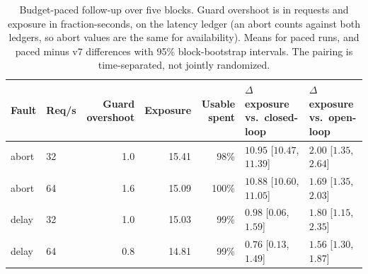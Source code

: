 \begin{table}[width=\textwidth,cols=7,pos=t]
\caption{Budget-paced follow-up over five blocks. Guard overshoot is in requests and exposure in fraction-seconds, on the latency ledger (an abort counts against both ledgers, so abort values are the same for availability). Means for paced runs, and paced minus v7 differences with 95\% block-bootstrap intervals. The pairing is time-separated, not jointly randomized.}\label{tbl:followup}
\footnotesize
\begin{tabular*}{\tblwidth}{@{\extracolsep{\fill}}llrrrll@{}}
\toprule
Fault & Req/s & Guard overshoot & Exposure & Usable spent & $\Delta$ exposure vs.\ closed-loop & $\Delta$ exposure vs.\ open-loop \\
\midrule
abort & 32 & 1.0 & 15.41 & 98\% & $10.95$ [$10.47$, $11.39$] & $2.00$ [$1.35$, $2.64$] \\
abort & 64 & 1.6 & 15.09 & 100\% & $10.88$ [$10.60$, $11.05$] & $1.69$ [$1.35$, $2.03$] \\
delay & 32 & 1.0 & 15.03 & 99\% & $0.98$ [$0.06$, $1.59$] & $1.80$ [$1.15$, $2.35$] \\
delay & 64 & 0.8 & 14.81 & 99\% & $0.76$ [$0.13$, $1.49$] & $1.56$ [$1.30$, $1.87$] \\
\bottomrule
\end{tabular*}
\end{table}
